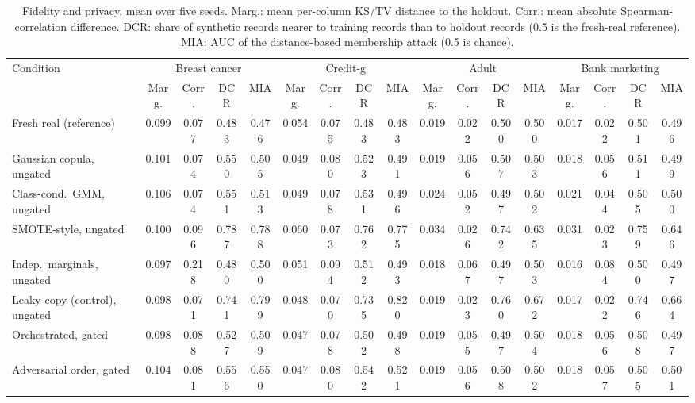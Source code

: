 \documentclass[journal]{IEEEtran}
\begin{document}
\begin{table}[!t]
\caption{Fidelity and privacy, mean over five seeds. Marg.: mean per-column KS/TV distance to the holdout. Corr.: mean absolute Spearman-correlation difference. DCR: share of synthetic records nearer to training records than to holdout records (0.5 is the fresh-real reference). MIA: AUC of the distance-based membership attack (0.5 is chance).}
\label{tab:privacy}
\centering
\scriptsize
\setlength{\tabcolsep}{2.5pt}
\begin{tabular}{lcccccccccccccccc}
\toprule
Condition & \multicolumn{4}{c}{Breast cancer} & \multicolumn{4}{c}{Credit-g} & \multicolumn{4}{c}{Adult} & \multicolumn{4}{c}{Bank marketing} \\
 & Marg. & Corr. & DCR & MIA & Marg. & Corr. & DCR & MIA & Marg. & Corr. & DCR & MIA & Marg. & Corr. & DCR & MIA \\
\midrule
Fresh real (reference) & 0.099 & 0.077 & 0.483 & 0.476 & 0.054 & 0.075 & 0.483 & 0.483 & 0.019 & 0.022 & 0.500 & 0.500 & 0.017 & 0.022 & 0.501 & 0.496 \\
Gaussian copula, ungated & 0.101 & 0.074 & 0.550 & 0.505 & 0.049 & 0.080 & 0.523 & 0.491 & 0.019 & 0.056 & 0.507 & 0.503 & 0.018 & 0.056 & 0.511 & 0.499 \\
Class-cond.\ GMM, ungated & 0.106 & 0.074 & 0.551 & 0.513 & 0.049 & 0.078 & 0.531 & 0.496 & 0.024 & 0.052 & 0.497 & 0.502 & 0.021 & 0.044 & 0.505 & 0.500 \\
SMOTE-style, ungated & 0.100 & 0.096 & 0.787 & 0.788 & 0.060 & 0.073 & 0.762 & 0.775 & 0.034 & 0.026 & 0.742 & 0.635 & 0.031 & 0.023 & 0.759 & 0.646 \\
Indep.\ marginals, ungated & 0.097 & 0.218 & 0.480 & 0.500 & 0.051 & 0.094 & 0.512 & 0.493 & 0.018 & 0.067 & 0.497 & 0.503 & 0.016 & 0.084 & 0.500 & 0.497 \\
Leaky copy (control), ungated & 0.098 & 0.071 & 0.741 & 0.799 & 0.048 & 0.070 & 0.735 & 0.820 & 0.019 & 0.023 & 0.760 & 0.672 & 0.017 & 0.022 & 0.746 & 0.664 \\
Orchestrated, gated & 0.098 & 0.088 & 0.527 & 0.509 & 0.047 & 0.078 & 0.502 & 0.498 & 0.019 & 0.055 & 0.497 & 0.504 & 0.018 & 0.056 & 0.508 & 0.497 \\
Adversarial order, gated & 0.104 & 0.081 & 0.556 & 0.550 & 0.047 & 0.080 & 0.542 & 0.521 & 0.019 & 0.056 & 0.508 & 0.502 & 0.018 & 0.057 & 0.505 & 0.501 \\
\bottomrule
\end{tabular}
\end{table}
\end{document}
